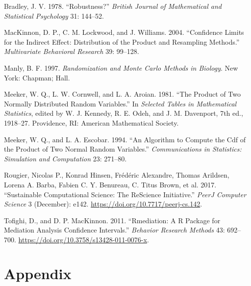 \documentclass[10,a4paperpaper,]{article}
\newenvironment{CSLReferences}%
  {}%
  {\par}
\begin{document}
\hypertarget{refs}{}
\begin{CSLReferences}{1}{0}
\leavevmode{}%
Bradley, J. V. 1978. {``Robustness?''} \emph{{B}ritish {J}ournal of
{M}athematical and {S}tatistical {P}sychology} 31: 144--52.

\leavevmode{}%
MacKinnon, D. P., C. M. Lockwood, and J. Williams. 2004. {``Confidence
Limits for the Indirect Effect: {D}istribution of the Product and
Resampling Methods.''} \emph{Multivariate {B}ehavioral {R}esearch} 39:
99--128.

\leavevmode{}%
Manly, B. F. 1997. \emph{Randomization and Monte Carlo Methods in
Biology}. New York: Chapman; Hall.

\leavevmode{}%
Meeker, W. Q., L. W. Cornwell, and L. A. Aroian. 1981. {``The Product of
Two Normally Distributed Random Variables.''} In \emph{Selected Tables
in Mathematical Statistics}, edited by W. J. Kennedy, R. E. Odeh, and J.
M. Davenport, 7th ed., 1918--27. Providence, RI: American Mathematical
Society.

\leavevmode{}%
Meeker, W. Q., and L. A. Escobar. 1994. {``An Algorithm to Compute the
Cdf of the Product of Two Normal Random Variables.''}
\emph{Communications in Statistics: Simulation and Computation} 23:
271--80.

\leavevmode{}%
Rougier, Nicolas P., Konrad Hinsen, Frédéric Alexandre, Thomas Arildsen,
Lorena A. Barba, Fabien C. Y. Benureau, C. Titus Brown, et al. 2017.
{``Sustainable Computational Science: The {ReScience} Initiative.''}
\emph{PeerJ Computer Science} 3 (December): e142.
\url{https://doi.org/10.7717/peerj-cs.142}.

\leavevmode{}%
Tofighi, D., and D. P. MacKinnon. 2011. {``Rmediation: {A} {R} Package
for Mediation Analysis Confidence Intervals.''} \emph{Behavior
{R}esearch {M}ethods} 43: 692--700.
\url{https://doi.org/10.3758/s13428-011-0076-x}.

\end{CSLReferences}

\FloatBarrier
\endgroup
\newpage

\section*{Appendix}
\end{document}
